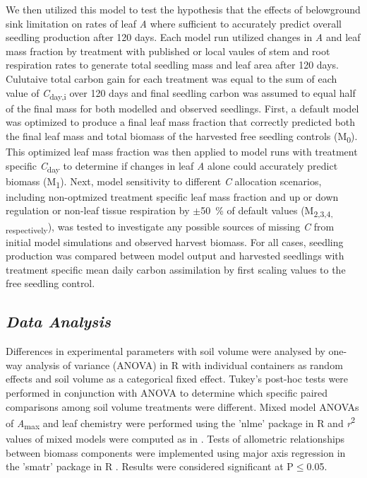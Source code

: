 \documentclass[a4paper]{article}\usepackage[]{graphicx}\usepackage[]{color}
\begin{document}
We then utilized this model to test the hypothesis that the effects of belowground sink limitation on rates of leaf \textit{A} where sufficient to accurately predict overall seedling production after 120 days. Each model run utilized changes in \textit{A} and leaf mass fraction by treatment with published or local vaules of stem and root respiration rates to generate total seedling mass and leaf area after 120 days.  Culutaive total carbon gain for each treatment was equal to the sum of each value of \textit{C}\textsubscript{day,i} over 120 days and final seedling carbon was assumed to equal half of the final mass for both modelled and observed seedlings. First, a default model was optimized to produce a final leaf mass fraction that correctly predicted both the final leaf mass and total biomass of the harvested free seedling controls (M\textsubscript{0}).  This optimized leaf mass fraction was then applied to model runs with treatment specific \textit{C}\textsubscript{day} to determine if changes in  leaf \textit{A} alone could accurately predict biomass (M\textsubscript{1}). Next, model sensitivity to different \textit{C} allocation scenarios, including non-optmized treatment specific leaf mass fraction and up or down regulation or non-leaf tissue respiration by $\pm$50~\% of default values (M\textsubscript{2,3,4, respectively}), was tested to investigate any possible sources of missing \textit{C} from initial model simulations and observed harvest biomass. For all cases, seedling production was compared between model output and harvested seedlings with treatment specific mean daily carbon assimilation by first scaling values to the free seedling control.

\subsection*{\textit{Data Analysis}}
Differences in experimental parameters with soil volume were analysed by one-way analysis of variance (ANOVA) in R with individual containers as random effects and soil volume as a categorical fixed effect. Tukey’s post-hoc tests were performed in conjunction with ANOVA to determine which specific paired comparisons among soil volume treatments were different. Mixed model ANOVAs of \textit{A}\textsubscript{max} and leaf chemistry were performed using the 'nlme' package \citep{nlme} in R and \textit{r}\textsuperscript{2} values of mixed models were computed as in \citet{nakagawa2013general}. Tests of allometric relationships between biomass components were implemented using major axis regression in the 'smatr' package in R \citep{warton2012smatr}. Results were considered significant at P$\leq$0.05.
\end{document}
